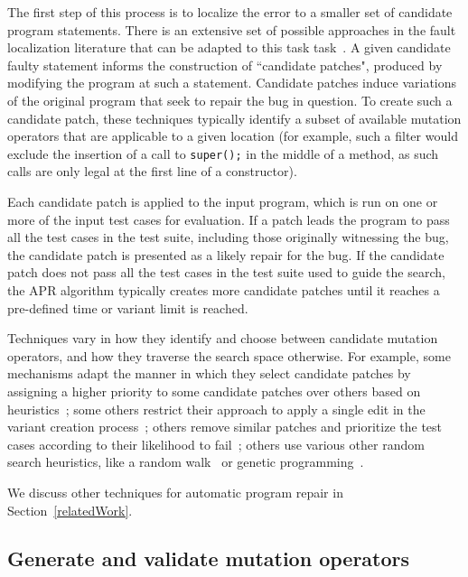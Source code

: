 \documentclass[conference]{IEEEtran}
\begin{document}
The first step of this process is to localize the error to a smaller set of
candidate program statements. There is an extensive set of possible approaches
in the fault localization literature that can be adapted to this task
task~\cite{Jones05,Jones02,Chen02,Qi2013}.  A given candidate faulty statement informs
the construction of 
``candidate patches", produced by modifying the program at such a
statement. Candidate patches induce variations of the original program 
that seek to repair the bug in question. To 
create such a candidate patch, these techniques typically identify a subset of
available mutation operators that are applicable to a given location (for
example, such a filter would exclude the insertion of a call to
\texttt{super();} in the middle of a method, as such calls are only legal at the
first line of a constructor). 

Each candidate patch is applied to the input program, which is run on
one or more of the input test cases for evaluation.  If a patch leads the
program to 
pass all the test cases in the test suite, including those originally witnessing
the bug, the candidate patch is presented as a likely repair for the bug. 
If the candidate patch does not pass all the test cases in 
the test suite used to guide the search, the APR
algorithm typically creates more candidate patches 
until it reaches a pre-defined time or variant limit is reached. 

Techniques vary in how they identify and choose between candidate mutation
operators, and how they traverse the search space otherwise. For example, some
mechanisms adapt the manner in which they select candidate patches by assigning
a higher priority to some candidate patches over others based on heuristics~\cite{long16proph};
some others restrict their approach to apply a single edit in the variant
creation process~\cite{Qi13TrpAutoR}; others remove similar patches and prioritize the test cases
according to their likelihood to fail~\cite{Weimer13}; others use various other
random search heuristics, like a random walk~\cite{debroy10} or genetic
programming~\cite{kim2013,legoues12}. 

We discuss other techniques for automatic program repair in
Section~\ref{relatedWork}.

\subsection{Generate and validate mutation operators} 
\label{categorization}
\end{document}
